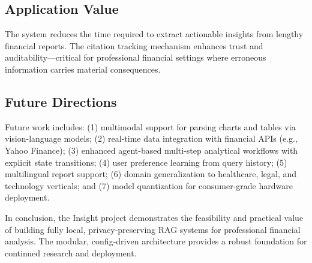 \documentclass[11pt, a4paper]{article}
\begin{document}
\subsection{Application Value}

The system reduces the time required to extract actionable insights from
lengthy financial reports. The citation tracking mechanism enhances trust and
auditability---critical for professional financial settings where erroneous
information carries material consequences.

\subsection{Future Directions}

Future work includes: (1) multimodal support for parsing charts and tables via
vision-language models; (2) real-time data integration with financial APIs
(e.g., Yahoo Finance); (3) enhanced agent-based multi-step analytical workflows
with explicit state transitions; (4) user preference learning from query
history; (5) multilingual report support; (6) domain generalization to
healthcare, legal, and technology verticals; and (7) model quantization for
consumer-grade hardware deployment.

\vspace{6pt}
\noindent In conclusion, the Insight project demonstrates the feasibility and practical value of building fully local, privacy-preserving RAG systems for professional financial analysis. The modular, config-driven architecture provides a robust foundation for continued research and deployment.

\newpage
\end{document}
